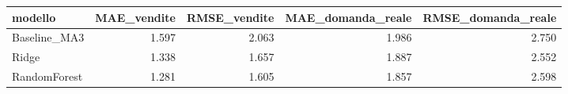 \begin{tabular}{lrrrr}
\toprule
modello & MAE_vendite & RMSE_vendite & MAE_domanda_reale & RMSE_domanda_reale \\
\midrule
Baseline_MA3 & 1.597 & 2.063 & 1.986 & 2.750 \\
Ridge & 1.338 & 1.657 & 1.887 & 2.552 \\
RandomForest & 1.281 & 1.605 & 1.857 & 2.598 \\
\bottomrule
\end{tabular}
